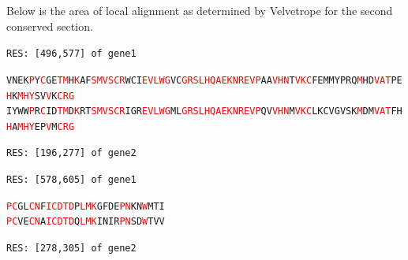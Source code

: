 \documentclass[phd,tocprelim]{cornell}
\begin{document}
Below is the area of local alignment as determined by Velvetrope for the second conserved section.

\begin{flushleft}
\singlespacing
\footnotesize 
\texttt{RES: [496,577] of gene1}           

\texttt{VNEK\textcolor{red}{P}Y\textcolor{red}{C}GE\textcolor{red}{T}\textcolor{red}{M}H\textcolor{red}{K}AF\textcolor{red}{S}\textcolor{red}{M}\textcolor{red}{V}\textcolor{red}{S}\textcolor{red}{C}\textcolor{red}{R}WCI\textcolor{red}{E}\textcolor{red}{V}\textcolor{red}{L}\textcolor{red}{W}\textcolor{red}{G}VC\textcolor{red}{G}\textcolor{red}{R}\textcolor{red}{S}\textcolor{red}{L}\textcolor{red}{H}\textcolor{red}{Q}\textcolor{red}{A}\textcolor{red}{E}\textcolor{red}{K}\textcolor{red}{N}\textcolor{red}{R}\textcolor{red}{E}\textcolor{red}{V}\textcolor{red}{P}AA\textcolor{red}{V}\textcolor{red}{H}\textcolor{red}{N}T\textcolor{red}{V}\textcolor{red}{K}\textcolor{red}{C}FEMMYPRQ\textcolor{red}{M}HD\textcolor{red}{V}\textcolor{red}{A}\textcolor{red}{T}PE\textcolor{red}{H}K\textcolor{red}{M}\textcolor{red}{H}\textcolor{red}{Y}SV\textcolor{red}{V}K\textcolor{red}{C}\textcolor{red}{R}\textcolor{red}{G}} \\
\texttt{IYWW\textcolor{red}{P}R\textcolor{red}{C}ID\textcolor{red}{T}\textcolor{red}{M}D\textcolor{red}{K}RT\textcolor{red}{S}\textcolor{red}{M}\textcolor{red}{V}\textcolor{red}{S}\textcolor{red}{C}\textcolor{red}{R}IGR\textcolor{red}{E}\textcolor{red}{V}\textcolor{red}{L}\textcolor{red}{W}\textcolor{red}{G}ML\textcolor{red}{G}\textcolor{red}{R}\textcolor{red}{S}\textcolor{red}{L}\textcolor{red}{H}\textcolor{red}{Q}\textcolor{red}{A}\textcolor{red}{E}\textcolor{red}{K}\textcolor{red}{N}\textcolor{red}{R}\textcolor{red}{E}\textcolor{red}{V}\textcolor{red}{P}QV\textcolor{red}{V}\textcolor{red}{H}\textcolor{red}{N}M\textcolor{red}{V}\textcolor{red}{K}\textcolor{red}{C}LKCVGVSK\textcolor{red}{M}DM\textcolor{red}{V}\textcolor{red}{A}\textcolor{red}{T}FH\textcolor{red}{H}A\textcolor{red}{M}\textcolor{red}{H}\textcolor{red}{Y}EP\textcolor{red}{V}M\textcolor{red}{C}\textcolor{red}{R}\textcolor{red}{G}}

\texttt{RES: [196,277] of gene2}

\texttt{RES: [578,605] of gene1}

\texttt{\textcolor{red}{P}\textcolor{red}{C}GL\textcolor{red}{C}\textcolor{red}{N}F\textcolor{red}{I}\textcolor{red}{C}\textcolor{red}{D}\textcolor{red}{T}\textcolor{red}{D}P\textcolor{red}{L}\textcolor{red}{M}\textcolor{red}{K}GFDE\textcolor{red}{P}\textcolor{red}{N}KN\textcolor{red}{W}MTI} \\
\texttt{\textcolor{red}{P}\textcolor{red}{C}VE\textcolor{red}{C}\textcolor{red}{N}A\textcolor{red}{I}\textcolor{red}{C}\textcolor{red}{D}\textcolor{red}{T}\textcolor{red}{D}Q\textcolor{red}{L}\textcolor{red}{M}\textcolor{red}{K}INIR\textcolor{red}{P}\textcolor{red}{N}SD\textcolor{red}{W}TVV}

\texttt{RES: [278,305] of gene2}

\normalsize
\normalspacing
\end{flushleft}
\end{document}
